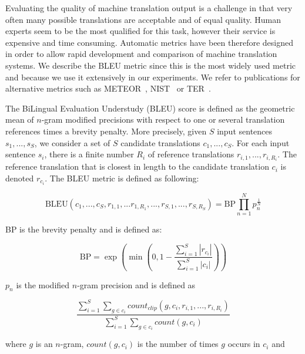     Evaluating the quality of machine translation output is a challenge in that very often many possible
    translations are acceptable and of equal quality. Human experts seem to be the most qualified for this task, however
    their service is expensive and time consuming. Automatic metrics have been therefore designed
    in order to allow rapid development and comparison of machine translation systems. We describe
    the BLEU metric since this is the most widely used metric and because we use it extensively in our experiments.
    We refer to publications for alternative metrics such as 
    METEOR~\citep{banerjee-lavie:2005:MTSumm}, NIST~\citep{doddington:2002:HLTR} or
    TER~\citep{snover-dorr-schwartz-micciulla-makhoul:2006:AMTA}.

    The BiLingual Evaluation Understudy (BLEU) score \cite{papineni-roukos-ward-zhu:2002:ACL} is defined as 
    the geometric mean of $n$-gram modified precisions with respect
    to one or several translation references times a brevity penalty. More precisely, given $S$ input sentences
    $s_1,...,s_S$, we consider a set of $S$ candidate translations $c_1,...,c_S$. For each input sentence $s_i$, there is
    a finite number $R_i$ of reference translations $r_{i,1},...,r_{i,R_i}$. The reference translation
    that is closest in length to the candidate translation $c_i$ is denoted $r_{c_i}$. The BLEU metric is defined as following:

    \begin{equation}
      \mbox{BLEU}(c_1,...,c_S,r_{1,1},...r_{1,R_1},...,r_{S,1},...,r_{S,R_S}) = \mbox{BP} \prod_{n=1}^N p_n^{\frac{1}{N}}
    \end{equation}

    \noindent BP is the brevity penalty and is defined as:

    \begin{equation}
      \mbox{BP} = \exp(\min(0,1-\frac{\sum_{i=1}^S |r_{c_i}|}{\sum_{i=1}^S |c_i|}))
    \end{equation}

    \noindent $p_n$ is the modified $n$-gram precision and is defined as

    \begin{equation}
      \frac{\sum_{i=1}^S \sum_{g \in c_i} count_{clip}(g,c_i,r_{i,1},...,r_{i,R_i})}{\sum_{i=1}^S \sum_{g \in c_i} count(g,c_i)}
    \end{equation}

    \noindent where $g$ is an $n$-gram, $count(g,c_i)$ is the number of times $g$ occurs in $c_i$ and 
    
